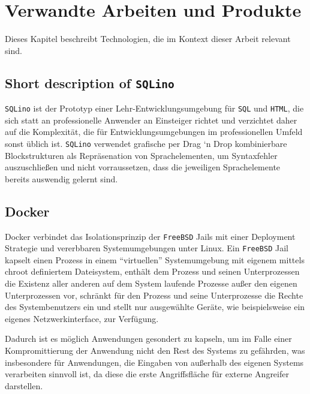 \section{Verwandte Arbeiten und Produkte}
\label{sec:related-work}

Dieses Kapitel beschreibt Technologien, die im Kontext dieser Arbeit relevant
sind.

\subsection{Short description of \texttt{SQLino}}

\texttt{SQLino} ist der Prototyp einer Lehr-Entwicklungsumgebung für
\texttt{SQL} und \texttt{HTML}, die sich statt an professionelle Anwender an
Einsteiger richtet und verzichtet daher auf die Komplexität, die für
Entwicklungsumgebungen im professionellen Umfeld sonst üblich ist.
\texttt{SQLino} verwendet grafische per Drag `n Drop kombinierbare
Blockstrukturen als Repräsenation von Sprachelementen, um Syntaxfehler
auszuschließen und nicht vorraussetzen, dass die jeweiligen Sprachelemente
bereits auswendig gelernt sind. \cite{blattwerkzeug-thesis}

\subsection{Docker}
Docker verbindet das Isolationsprinzip der \texttt{FreeBSD} Jails mit einer
Deployment Strategie und vererbbaren Systemumgebungen unter Linux. Ein
\texttt{FreeBSD} Jail kapselt einen Prozess in einem ``virtuellen''
Systemumgebung mit eigenem mittels chroot definiertem Dateisystem, enthält dem
Prozess und seinen Unterprozessen die Existenz aller anderen auf dem System
laufende Prozesse außer den eigenen Unterprozessen vor, schränkt für den Prozess
und seine Unterprozesse die Rechte des Systembenutzers ein und stellt nur
ausgewählte Geräte, wie beispielsweise ein eigenes Netzwerkinterface, zur
Verfügung. \cite{FreeBSD-Jail-doc} \cite{FreeBSD-Jail-developer-comments}
\cite{FreeBSD-Jail-paper}

Dadurch ist es möglich Anwendungen gesondert zu kapseln, um im Falle einer
Kompromittierung der Anwendung nicht den Rest des Systems zu gefährden, was
insbesondere für Anwendungen, die Eingaben von außerhalb des eigenen Systems
verarbeiten sinnvoll ist, da diese die erste Angriffsfläche für externe
Angreifer darstellen.

